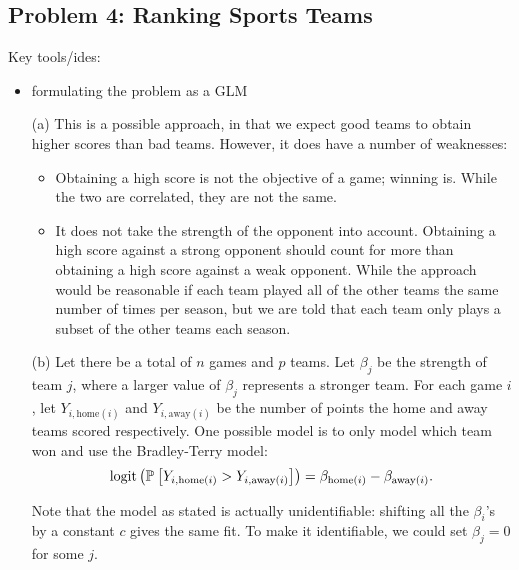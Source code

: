 \subsection*{Problem 4: Ranking Sports Teams}
Key tools/ides:
\begin{itemize}
\item formulating the problem as a GLM
\end{itemize}

\begin{enumerate}
\item[(a)] This is a possible approach, in that we expect good teams to obtain higher scores than bad teams. However, it does have a number of weaknesses:
\begin{itemize}
\item Obtaining a high score is not the objective of a game; winning is. While the two are correlated, they are not the same.

\item It does not take the strength of the opponent into account. Obtaining a high score against a strong opponent should count for more than obtaining a high score against a weak opponent. While the approach would be reasonable if each team played all of the other teams the same number of times per season, but we are told that each team only plays a subset of the other teams each season.
\end{itemize}

\item[(b)] Let there be a total of $n$ games and $p$ teams. Let $\beta_j$ be the strength of team $j$, where a larger value of $\beta_j$ represents a stronger team. For each game $i$, let $Y_{i, \text{home}(i)}$ and $Y_{i, \text{away}(i)}$ be the number of points the home and away teams scored respectively. One possible model is to only model which team won and use the Bradley-Terry model:
\begin{equation}\label{eqn:4b}
\text{logit}\left( \mathbb{P}_{}\left[ Y_{i, \text{home}(i)} > Y_{i, \text{away}(i)}\right]\right) = \beta_{\text{home}(i)} - \beta_{\text{away}(i)}.
\end{equation}


Note that the model as stated is actually unidentifiable: shifting all the $\beta_i$'s by a constant $c$ gives the same fit. To make it identifiable, we could set $\beta_j = 0$ for some $j$.





\end{enumerate}
